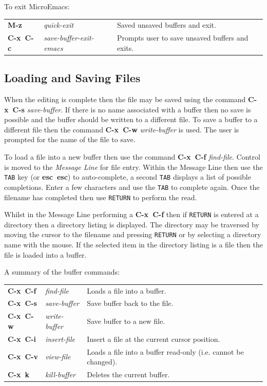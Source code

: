 \documentclass[11pt,a4paper,pdftex]{article}
\begin{document}
  To exit MicroEmacs:

  \begin{longtable}{ll@{\ --\ }l}
    \endhead
    \endfoot
    \endlastfoot
    \textbf{M-z} & \textit{quick-exit} &
    Saved unsaved buffers and exit.\\
    \textbf{C-x~C-c} & \textit{save-buffer-exit-emacs} &
    Prompts user to save unsaved buffers and exits.\\
  \end{longtable}

\subsection{Loading and Saving Files}

  When the editing is complete then the file may be saved using the command
  \textbf{C-x~C-s} \textit{save-buffer}. If there is no name associated with a
  buffer then no save is possible and the buffer should be written to a
  different file. To save a buffer to a different file then the command
  \textbf{C-x~C-w} \textit{write-buffer} is used. The user is prompted for the
  name of the file to save.

  To load a file into a new buffer then use the command \textbf{C-x~C-f}
  \textit{find-file}. Control is moved to the \textit{Message Line} for file
  entry. Within the Message Line then use the \texttt{TAB} key (or
  \textbf{esc~esc}) to auto-complete, a second \texttt{TAB} displays a list of
  possible completions. Enter a few characters and use the \texttt{TAB} to
  complete again. Once the filename has completed then use \texttt{RETURN} to
  perform the read.

  Whilst in the Message Line performing a \textbf{C-x~C-f} then if
  \texttt{RETURN} is entered at a directory then a directory listing is
  displayed. The directory may be traversed by moving the cursor to the
  filename and pressing \texttt{RETURN} or by selecting a directory name with
  the mouse. If the selected item in the directory listing is a file then the
  file is loaded into a buffer.

  A summary of the buffer commands:

  \begin{longtable}{ll@{\ --\ }l}
    \endhead
    \endfoot
    \endlastfoot
    \textbf{C-x~C-f} & \textit{find-file} &
    Loads a file into a buffer.\\
    \textbf{C-x~C-s} & \textit{save-buffer} &
    Save buffer back to the file.\\
    \textbf{C-x~C-w} & \textit{write-buffer} &
    Save buffer to a new file.\\
    \textbf{C-x~C-i} & \textit{insert-file} &
    Insert a file at the current cursor position.\\
    \textbf{C-x~C-v} & \textit{view-file} &
    Loads a file into a buffer read-only (i.e. cannot be changed).\\
    \textbf{C-x~k} & \textit{kill-buffer} &
    Deletes the current buffer.\\
  \end{longtable}
\end{document}
